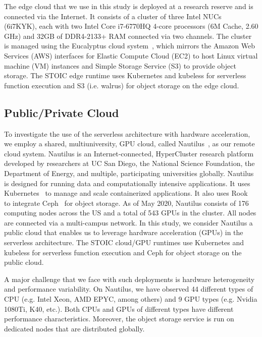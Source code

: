 The edge cloud that we use in this study is deployed at a research reserve and is connected via the Internet.  It consists of a cluster of three Intel NUCs~\cite{ref:nucs} (6i7KYK), each with two Intel Core i7-6770HQ 4-core processors (6M Cache, 2.60 GHz) and 32GB of DDR4-2133+ RAM connected via two channels. The cluster is managed using the Eucalyptus cloud system~\cite{ref:euca}, which mirrors the Amazon Web Services (AWS) interfaces for Elastic Compute Cloud (EC2) to host Linux virtual machine (VM) instances and Simple Storage Service (S3) to provide object storage. The STOIC edge runtime uses Kubernetes and kubeless for serverless function execution and S3 (i.e. walrus) for object storage on the edge cloud.
 
\subsection{Public/Private Cloud}

To investigate the use of the serverless architecture with hardware acceleration, we employ a shared, multiuniversity, GPU cloud, called Nautilus~\cite{ref:nautilus}, as our remote cloud system. Nautilus is an Internet-connected, HyperCluster research platform developed by researchers at UC San Diego, the National Science Foundation, the Department of Energy, and multiple, participating universities globally.  Nautilus is designed for running data and computationally intensive applications. It uses Kubernetes~\cite{ref:k8s} to manage and scale containerized applications. It also uses Rook~\cite{ref:rook} to integrate Ceph~\cite{ref:ceph} for object storage. As of May 2020, Nautilus consists of 176 computing nodes across the US and a total of 543 GPUs in the cluster. All nodes are connected via a multi-campus network. In this study, we consider Nautilus a public cloud that enables us to leverage hardware acceleration (GPUs) in the serverless architecture. The STOIC cloud/GPU runtimes use Kubernetes and kubeless for serverless function execution and Ceph for object storage on the public cloud.

A major challenge that we face with such deployments is hardware heterogeneity and performance variability. On Nautilus, we have observed 44 different types of CPU (e.g. Intel Xeon, AMD EPYC, among others) and 9 GPU types (e.g. Nvidia 1080Ti, K40, etc.). Both CPUs and GPUs of different types have different performance characteristics. Moreover, the object storage service is run on dedicated nodes that are distributed globally.

